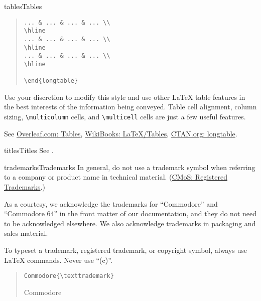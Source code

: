 \begin{sgentry}{tables}{Tables}
\begin{quote}
\begin{verbatim}
... & ... & ... & ... \\
\hline
... & ... & ... & ... \\
\hline
... & ... & ... & ... \\
\hline

\end{longtable}
\end{verbatim}
\end{quote}

    Use your discretion to modify this style and use other LaTeX table features in the best interests of the information being conveyed. Table cell alignment, column sizing, \texttt{{\textbackslash}multicolumn} cells, and \texttt{{\textbackslash}multicell} cells are just a few useful features.

    See \href{https://www.overleaf.com/learn/latex/Tables}{Overleaf.com: Tables}, \href{https://en.wikibooks.org/wiki/LaTeX/Tables}{WikiBooks: LaTeX/Tables}, \href{https://ctan.org/pkg/longtable?lang=en}{CTAN.org: longtable}.
\end{sgentry}

\begin{sgentry}{titles}{Titles}
    See .
\end{sgentry}

\begin{sgentry}{trademarks}{Trademarks}
    In general, do not use a trademark symbol when referring to a company or product name in technical material. (\href{https://www.chicagomanualofstyle.org/qanda/data/faq/topics/RegisteredTrademarks.html}{CMoS: Registered Trademarks}.)

    As a courtesy, we acknowledge the trademarks for ``Commodore'' and ``Commodore 64'' in the front matter of our documentation, and they do not need to be acknowledged elsewhere. We also acknowledge trademarks in packaging and sales material.

    To typeset a trademark, registered trademark, or copyright symbol, always use LaTeX commands. Never use ``(c)''.

    \begin{quote}
        \texttt{Commodore\{{\textbackslash}texttrademark\}}

        \hrulefill

        Commodore{\texttrademark}
    \end{quote}
\end{sgentry}

